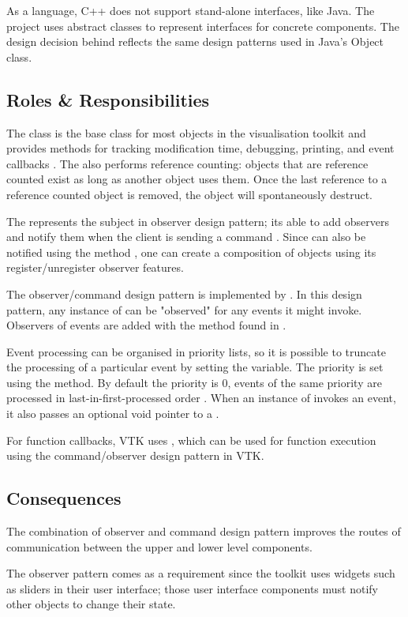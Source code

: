 As a language, C++ does not support stand-alone interfaces, like Java. The project uses abstract classes to represent interfaces for concrete components. The design decision behind  reflects the same design patterns used in Java's Object class.


\subsection{Roles \& Responsibilities}

The class  is the base class for most objects in the visualisation toolkit and provides methods for tracking modification time, debugging, printing, and event callbacks \cite{git}. The  also performs reference counting: objects that are reference counted exist as long as another object uses them. Once the last reference to a reference counted object is removed, the object will spontaneously destruct. 

The  represents the subject in observer design pattern; its able to add observers and notify them when the client is sending a command . Since  can also be notified using the method   \cite{git}, one can create a composition of  objects using its register/unregister observer features.

The observer/command design pattern is implemented by . In this design pattern, any instance of  can be "observed" for any events it might invoke. Observers of events are added with the  method found in .  

Event processing can be organised in priority lists, so it is possible to truncate the processing of a particular event by setting the  variable. The priority is set using the  method. By default the priority is 0, events of the same priority are processed in last-in-first-processed order  \cite{git}. When an instance of  invokes an event, it also passes an optional void pointer to a . 

For function callbacks, VTK uses , which can be used for function execution using the command/observer design pattern in VTK.

\subsection{Consequences}

\begin{consequences}
The combination of observer and command design pattern improves the routes of communication between the upper and lower level components.
\end{consequences}

\begin{consequences}
The observer pattern comes as a requirement since the toolkit uses widgets such as sliders in their user interface; those user interface components must notify other objects to change their state.
\end{consequences}
